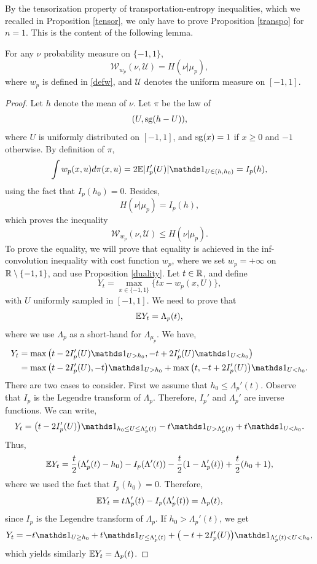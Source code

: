 \documentclass[a4paper,oneside,11pt]{article}
\begin{document}
By the tensorization property of transportation-entropy inequalities, which we recalled in Proposition \ref{tensor}, we only have to prove Proposition \ref{transpo} for $n=1$. This is the content of the following lemma.

\begin{Lem}\label{init}
 For any $\nu$ probability measure on $\{-1,1\}$,
\begin{equation} \label{transpo1}\mathcal{W}_{w_p}(\nu, \mathcal{U}) = H(\nu | \mu_p),\end{equation}
where $w_p$ is defined in \eqref{defw}, and $\mathcal{U}$ denotes the uniform measure on $[-1,1]$.
\end{Lem}
\begin{proof}
Let $h$ denote the mean of $\nu$. Let $\pi$ be the law of
$$ (U,\mathrm{sg}(h-U)),$$
where $U$ is uniformly distributed on $[-1,1]$, and $\mathrm{sg}(x) = 1$ if $x\geq 0$ and $-1$ otherwise.
By definition of $\pi$,
$$ \int w_p(x,u) d\pi(x,u) = 2\EE  |I'_p(U)| \Car_{U\in (h,h_0)} = I_p(h),$$
using the fact that $I_p(h_0) = 0$.
Besides,
$$ H(\nu| \mu_p) = I_p(h),$$
which proves the inequality
$$ \mathcal{W}_{w_p}(\nu,\mathcal{U})\leq H(\nu|\mu_p).$$
To prove the equality, we will prove that equality is achieved in the inf-convolution inequality with cost function $w_p$, where  we set $w_p = +\infty$ on $\mathbb{R}\setminus \{-1,1\}$, and use Proposition \ref{duality}.
Let $t \in \mathbb{R}$, and define 
$$ Y_t =  \max_{x \in \{-1,1\}} \{tx -w_p(x,U) \},$$
with $U$ uniformly sampled in $[-1,1]$. We need to prove that 
\begin{equation} \label{optimexp}\mathbb{E} Y_t = \Lambda_{p}(t),\end{equation}
where we use $\Lambda_p$ as a short-hand for $\Lambda_{\mu_p}$. We have,
\begin{align*}
Y_t & = \max\big( t -2I_p'(U)\Car_{U>h_0}, -t +2I_p'(U)\Car_{U <h_0}\big)\\
& = \max\big( t-2I_p'(U), -t \big)\Car
_{U>h_0} + \max\big( t, -t+2I_p'(U)\big)\Car_{U<h_0}.
\end{align*}
There are two cases to consider. First we assume that $h_0 \leq \Lambda_p'(t)$. Observe that $I_p$ is the Legendre transform of $\Lambda_p$. Therefore, $I_p'$ and $\Lambda_p'$ are inverse functions. 
We can write,
$$Y_t  = \big(t-2I_p'(U)\big)\Car_{h_0 \leq U \leq \Lambda_p'(t)} -t \Car_{U>\Lambda_p'(t)}+ t \Car_{U<h_0}.$$
Thus, 
$$ \mathbb{E} Y_t = \frac{t}{2} ( \Lambda_p'(t) - h_0) - I_p(\Lambda'(t))  - \frac{t}{2}(1- \Lambda_p'(t))+\frac{t}{2}(h_0+1),$$
where we used the fact that $I_p(h_0) = 0$. Therefore, 
$$ \mathbb{E} Y_t = t \Lambda_p'(t) -I_p(\Lambda_p'(t)) = \Lambda_p(t), $$
since $I_p$ is the Legendre transform of $\Lambda_p$. If $h_0 >\Lambda_p'(t)$, we get 
$$Y_t  = -t \Car_{U\geq h_0} + t \Car_{U \leq \Lambda_p'(t)} +\big(-t+2 I_p'(U)\big)\Car_{\Lambda_p'(t) < U <h_0},$$ 
which yields similarly $\mathbb{E} Y_t = \Lambda_p(t)$.

\end{proof}
\end{document}
